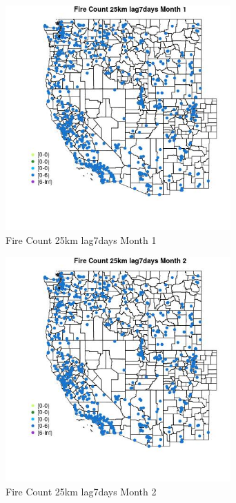 \begin{figure} 
\centering  
\includegraphics[width=0.77\textwidth]{Code_Outputs/Report_ML_input_PM25_Step4_part_e_de_duplicated_aves_compiled_2019-05-21wNAs_MapObsMo1Fire_Count_25km_lag7days.jpg} 
\caption{\label{fig:Report_ML_input_PM25_Step4_part_e_de_duplicated_aves_compiled_2019-05-21wNAsMapObsMo1Fire_Count_25km_lag7days}Fire Count 25km lag7days Month 1} 
\end{figure} 
 

\clearpage 

\begin{figure} 
\centering  
\includegraphics[width=0.77\textwidth]{Code_Outputs/Report_ML_input_PM25_Step4_part_e_de_duplicated_aves_compiled_2019-05-21wNAs_MapObsMo2Fire_Count_25km_lag7days.jpg} 
\caption{\label{fig:Report_ML_input_PM25_Step4_part_e_de_duplicated_aves_compiled_2019-05-21wNAsMapObsMo2Fire_Count_25km_lag7days}Fire Count 25km lag7days Month 2} 
\end{figure} 
 

